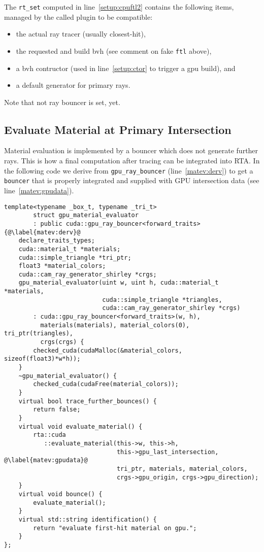 \documentclass[a4paper,11pt]{scrartcl}
\begin{document}
The \lstinline|rt_set| computed in line~\ref{setup:cpuftl2} contains the following items, managed by the called plugin to be compatible:
\begin{itemize}
\item the actual ray tracer (usually closest-hit),
\item the requested and build bvh (see comment on fake \lstinline|ftl| above),
\item a bvh contructor (used in line~\ref{setup:ctor} to trigger a gpu build), and
\item a default generator for primary rays.
\end{itemize}
Note that not ray bouncer is set, yet.

\subsection{Evaluate Material at Primary Intersection}
Material evaluation is implemented by a bouncer which does not generate further rays.
This is how a final computation after tracing can be integrated into RTA.
In the following code we derive from \lstinline|gpu_ray_bouncer| (line~\ref{matev:derv}) to get a \lstinline|bouncer| 
	that is properly integrated and supplied with GPU intersection data (see line~\ref{matev:gpudata}).
\begin{lstlisting}
template<typename _box_t, typename _tri_t>
		struct gpu_material_evaluator 
		: public cuda::gpu_ray_bouncer<forward_traits> {@\label{matev:derv}@
	declare_traits_types;
	cuda::material_t *materials;
	cuda::simple_triangle *tri_ptr;
	float3 *material_colors;
	cuda::cam_ray_generator_shirley *crgs;
	gpu_material_evaluator(uint w, uint h, cuda::material_t *materials, 
	                       cuda::simple_triangle *triangles, 
						   cuda::cam_ray_generator_shirley *crgs)
		: cuda::gpu_ray_bouncer<forward_traits>(w, h), 
		  materials(materials), material_colors(0), tri_ptr(triangles),
		  crgs(crgs) {
		checked_cuda(cudaMalloc(&material_colors, sizeof(float3)*w*h));
	}
	~gpu_material_evaluator() {
		checked_cuda(cudaFree(material_colors));
	}
	virtual bool trace_further_bounces() {
		return false;
	}
	virtual void evaluate_material() {
		rta::cuda
		   ::evaluate_material(this->w, this->h, 
						       this->gpu_last_intersection, @\label{matev:gpudata}@
						       tri_ptr, materials, material_colors, 
						       crgs->gpu_origin, crgs->gpu_direction);
	}
	virtual void bounce() {
		evaluate_material();
	}
	virtual std::string identification() {
		return "evaluate first-hit material on gpu.";
	}
};
\end{lstlisting}
\end{document}
